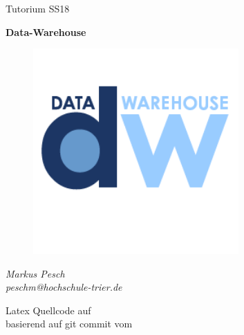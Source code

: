 \begin{titlepage}
  \begin{center}
    \begin{large}
      Tutorium SS18
    \end{large}
    
    \begin{huge}
      \begin{singlespace}
            \textbf{Data-Warehouse}
      \end{singlespace}
    \end{huge}

    \vspace{0.5cm}

    \begin{figure}[h]
      \centering
      \includegraphics[width=0.70\textwidth]{img//warehouse-logo.png}
      \label{img:fh-trier-logo}
    \end{figure}

    \vspace{1cm}
    
    \begin{large}
      \textit{Markus Pesch} \\
      \textit{peschm@hochschule-trier.de}
    \end{large}
    
    \vspace{2cm}
    
    Latex Quellcode auf  \\
    basierend auf git commit  vom 
    
    
  \end{center}
\end{titlepage}

